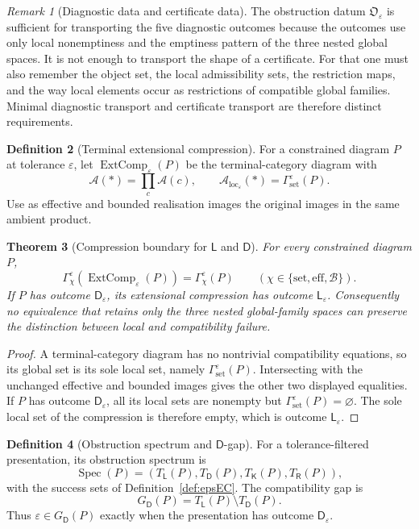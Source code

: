 \documentclass[11pt]{article}
\theoremstyle{plain}
\newtheorem{theorem}{Theorem}[section]
\theoremstyle{definition}
\newtheorem{definition}[theorem]{Definition}
\theoremstyle{remark}
\newtheorem{remark}[theorem]{Remark}
\newcommand{\LocalAdm}{\mathcal{A}_{\mathrm{loc}}}
\newcommand{\eps}{\varepsilon}
\begin{document}
\begin{remark}[Diagnostic data and certificate data]
The obstruction datum $\mathfrak O_\eps$ is sufficient for transporting the five
diagnostic outcomes because the outcomes use only local nonemptiness and the
emptiness pattern of the three nested global spaces. It is not enough to
transport the shape of a certificate. For that one must also remember the object
set, the local admissibility sets, the restriction maps, and the way local
elements occur as restrictions of compatible global families. Minimal diagnostic
transport and certificate transport are therefore distinct requirements.
\end{remark}

\begin{definition}[Terminal extensional compression]
\label{def:extensional-compression}
For a constrained diagram $P$ at tolerance $\eps$, let
$\operatorname{ExtComp}_\eps(P)$ be the terminal-category diagram with
\[
\mathcal A(*)=\prod_c\mathcal A(c),
\qquad
\LocalAdm_\eps(*)=\Gamma_{\mathrm{set}}^\eps(P).
\]
Use as effective and bounded realisation images the original images in the same
ambient product.
\end{definition}

\begin{theorem}[Compression boundary for $\mathsf L$ and $\mathsf D$]
\label{thm:compression-boundary}
For every constrained diagram $P$,
\[
\Gamma_\chi^\eps(\operatorname{ExtComp}_\eps(P))
=\Gamma_\chi^\eps(P)
\qquad
(\chi\in\{\mathrm{set},\mathrm{eff},\mathcal B\}).
\]
If $P$ has outcome $\mathsf D_\eps$, its extensional compression has outcome
$\mathsf L_\eps$. Consequently no equivalence that retains only the three
nested global-family spaces can preserve the distinction between local and
compatibility failure.
\end{theorem}

\begin{proof}
A terminal-category diagram has no nontrivial compatibility equations, so its global
set is its sole local set, namely $\Gamma_{\mathrm{set}}^\eps(P)$. Intersecting
with the unchanged effective and bounded images gives the other two displayed
equalities. If $P$ has outcome $\mathsf D_\eps$, all its local sets are nonempty
but $\Gamma_{\mathrm{set}}^\eps(P)=\varnothing$. The sole local set of the
compression is therefore empty, which is outcome $\mathsf L_\eps$.
\end{proof}

\begin{definition}[Obstruction spectrum and $\mathsf D$-gap]
\label{def:obstruction-spectrum}
For a tolerance-filtered presentation, its obstruction spectrum is
\[
\operatorname{Spec}(P)=
(T_{\mathsf L}(P),T_{\mathsf D}(P),T_{\mathsf K}(P),T_{\mathsf R}(P)),
\]
with the success sets of Definition~\ref{def:epsEC}. The compatibility gap is
\[
G_{\mathsf D}(P)=T_{\mathsf L}(P)\setminus T_{\mathsf D}(P).
\]
Thus $\eps\in G_{\mathsf D}(P)$ exactly when the presentation has outcome
$\mathsf D_\eps$.
\end{definition}
\end{document}
